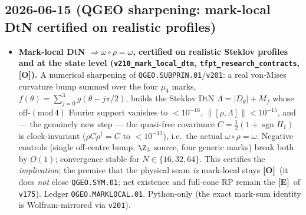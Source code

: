 \documentclass[11pt]{article}
\providecommand{\mE}{\textbf{[E]}}\providecommand{\mC}{\textbf{[C]}}
\providecommand{\mO}{\textbf{[O]}}\providecommand{\mX}{\textbf{[X]}}
\begin{document}
\subsection*{2026-06-15 (QGEO sharpening: mark-local DtN certified on realistic profiles)}
\begin{itemize}
\item \textbf{Mark-local DtN $\Rightarrow\omega\circ\rho=\omega$, certified on realistic Steklov profiles and
  at the state level (\texttt{v210\_mark\_local\_dtn}, \texttt{tfpt\_research\_contracts}, \mO).} A numerical
  sharpening of \texttt{QGEO.SUBPRIN.01}/\texttt{v201}: a real von-Mises curvature bump summed over the four
  $\mu_4$ marks, $f(\theta)=\sum_{j=0}^3 g(\theta-j\pi/2)$, builds the Steklov DtN $\Lambda=|D_\theta|+M_f$
  whose off-$(\mathrm{mod}\,4)$ Fourier support vanishes to $<10^{-16}$, $\|[\rho,\Lambda]\|<10^{-15}$, and ---
  the genuinely new step --- the quasi-free covariance $C=\tfrac12(1+\operatorname{sgn}H_1)$ is clock-invariant
  ($\rho C\rho^\dagger=C$ to $<10^{-13}$), i.e.\ the actual $\omega\circ\rho=\omega$. Negative controls (single
  off-centre bump, $\Z_3$ source, four generic marks) break both by $O(1)$; convergence stable for
  $N\in\{16,32,64\}$. This certifies the \emph{implication}; the premise that the physical seam \emph{is}
  mark-local stays \mO\ (it does \emph{not} close \texttt{QGEO.SYM.01}; net existence and full-cone RP remain
  the \mE\ of \texttt{v175}). Ledger \texttt{QGEO.MARKLOCAL.01}. Python-only (the exact mark-sum identity is
  Wolfram-mirrored via \texttt{v201}).
\end{itemize}
\end{document}

